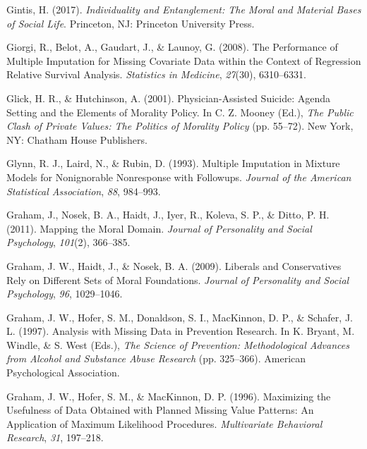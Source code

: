 \documentclass[12pt,econ]{sources/authesis}
\begin{document}
\leavevmode\hypertarget{ref-gintis_2017_individuality}{}%
Gintis, H. (2017). \emph{Individuality and Entanglement: The Moral and Material Bases of Social Life}. Princeton, NJ: Princeton University Press.

\leavevmode\hypertarget{ref-giorgi_2008_performance}{}%
Giorgi, R., Belot, A., Gaudart, J., \& Launoy, G. (2008). The Performance of Multiple Imputation for Missing Covariate Data within the Context of Regression Relative Survival Analysis. \emph{Statistics in Medicine}, \emph{27}(30), 6310--6331.

\leavevmode\hypertarget{ref-glick_2001_physician-assisted}{}%
Glick, H. R., \& Hutchinson, A. (2001). Physician-Assisted Suicide: Agenda Setting and the Elements of Morality Policy. In C. Z. Mooney (Ed.), \emph{The Public Clash of Private Values: The Politics of Morality Policy} (pp. 55--72). New York, NY: Chatham House Publishers.

\leavevmode\hypertarget{ref-glynn_1993_multiple}{}%
Glynn, R. J., Laird, N., \& Rubin, D. (1993). Multiple Imputation in Mixture Models for Nonignorable Nonresponse with Followups. \emph{Journal of the American Statistical Association}, \emph{88}, 984--993.

\leavevmode\hypertarget{ref-graham_2011_mapping}{}%
Graham, J., Nosek, B. A., Haidt, J., Iyer, R., Koleva, S. P., \& Ditto, P. H. (2011). Mapping the Moral Domain. \emph{Journal of Personality and Social Psychology}, \emph{101}(2), 366--385.

\leavevmode\hypertarget{ref-graham_2009_liberals}{}%
Graham, J. W., Haidt, J., \& Nosek, B. A. (2009). Liberals and Conservatives Rely on Different Sets of Moral Foundations. \emph{Journal of Personality and Social Psychology}, \emph{96}, 1029--1046.

\leavevmode\hypertarget{ref-graham_1997_analysis}{}%
Graham, J. W., Hofer, S. M., Donaldson, S. I., MacKinnon, D. P., \& Schafer, J. L. (1997). Analysis with Missing Data in Prevention Research. In K. Bryant, M. Windle, \& S. West (Eds.), \emph{The Science of Prevention: Methodological Advances from Alcohol and Substance Abuse Research} (pp. 325--366). American Psychological Association.

\leavevmode\hypertarget{ref-graham_1996_maximizing}{}%
Graham, J. W., Hofer, S. M., \& MacKinnon, D. P. (1996). Maximizing the Usefulness of Data Obtained with Planned Missing Value Patterns: An Application of Maximum Likelihood Procedures. \emph{Multivariate Behavioral Research}, \emph{31}, 197--218.
\end{document}
